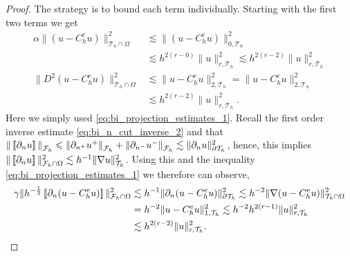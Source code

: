 \begin{proof}
    The strategy is to bound each term individually.
             Starting with the first two terms we get
             \begin{equation}
        \begin{split}
            \alpha  \|  ( u - C_{h}^{e}u) \|_{ \mathcal{T} _{h} \cap \Omega  }^{ 2}    & \lesssim \|  ( u - C_{h}^{e}u) \|_{0,\mathcal{T} _{h}  }^{ 2} \\
             &    \lesssim  h^{2(r-0)}    \| u \|_{r,\mathcal{T}_{h} }^{  2}\lesssim  h^{2(r-2)}    \| u \|_{r,\mathcal{T}_{h} }^{  2} \\
            \| D^2 ( u - C_{h}^{e}u ) \|_{\mathcal{T} _{h} \cap \Omega   }^{ 2 } &  \lesssim  \|  u - C_{h}^{e}u  \|_{2,\mathcal{T} _{h}   }^{ 2 }   =  \|  u - C_{h}^{e}u  \|_{2,\mathcal{T} _{h}   }^{ 2 } \\
                                                                                 & \lesssim  h^{2(r-2)} \| u \|_{ r, \mathcal{T}_{h}}^{ 2 }.
        \end{split}
             \end{equation}
    Here we simply used \eqref{eq:bi_projection_estimates_1}.
    Recall the first order inverse estimate \eqref{eq:bi_n_cut_inverse_2} and that $\| \left[\!\left[  \partial _{n} u  \right]\!\right]   \|_{ \mathcal{F} _{h} }^{  } \leqslant \| \partial _{n^{+}} u^{+}   \|_{ \mathcal{F} _{h} }^{  } +
    \|\partial _{n^{-}} u^{-}   \|_{ \mathcal{F} _{h} }^{  } \lesssim  \|\partial _{n} u \|_{ \partial\mathcal{T }_{h}  }^{2  }  $, hence, this implies $\| \left[\!\left[  \partial _{n} u  \right]\!\right]   \|_{   \mathcal{F}_{h}\cap \Omega    }^{2} \lesssim h^{-1} \| \nabla u \|_{ \mathcal{T}
        _{h} }^{2  }  $. Using this and the inequality \eqref{eq:bi_projection_estimates_1} we therefore can observe,
            \begin{equation}
        \begin{split}
            \gamma \| h^{-\frac{1}{2}} \jump{ \partial _{n} ( u - C_{h}^{e}u ) }   \|_{ \mathcal{F}_{h} \cap \Omega   }^{  2}   & \lesssim
            h^{-1} \|   \partial _{n} ( u - C_{h}^{e}u )    \|_{  \partial \mathcal{T} _{h} }^{2  } \lesssim  h^{-2} \|   \nabla  ( u - C_{h}^{e}u )    \|_{ \mathcal{T} _{h}\cap \Omega  }^{2  }\\
&=  h^{-2} \|    u - C_{h}^{e}u     \|_{ 1,\mathcal{T} _{h} }^{2  } \lesssim  h^{ -2 } h^{ 2(r - 1)  } \| u \|_{ r, \mathcal{T}_{h}   }^{  2} \\
& \lesssim   h^{ 2(r - 2)  } \| u \|_{ r, \mathcal{T}_{h}   }^{  2} . \\
        \end{split}

\end{equation}
\end{proof}
